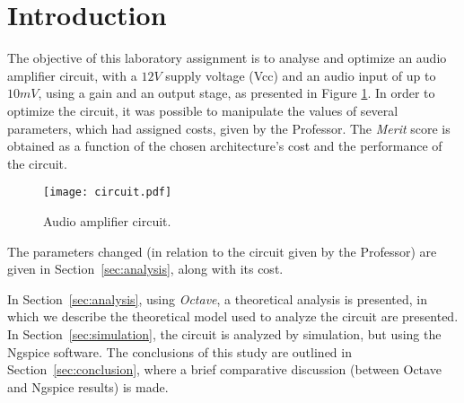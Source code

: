 \section{Introduction}
\label{sec:introduction}

The objective of this laboratory assignment is to analyse and optimize an audio amplifier circuit, with a $12V$ supply voltage (Vcc) and an audio input of up to $10mV$, using a gain and an output stage, as presented in Figure  \ref{fig:circuit}. In order to optimize the circuit, it was possible to manipulate the values of several parameters, which had assigned costs, given by the Professor. The \textit{Merit} score is obtained as a function of the chosen architecture's cost and the performance of the circuit. 


\begin{figure}[h] \centering
\texttt{[image: circuit.pdf]}
\caption{Audio amplifier circuit.}
\label{fig:circuit}
\end{figure}

The parameters changed (in relation to the circuit given by the Professor) are given in Section~\ref{sec:analysis}, along with its cost.


In Section~\ref{sec:analysis}, using \textit{Octave}, a theoretical analysis is presented, in which we describe the theoretical model used to analyze the circuit are presented. In Section~\ref{sec:simulation}, the circuit is analyzed by simulation, but using the Ngspice software. The conclusions of this study are outlined in Section~\ref{sec:conclusion}, where a brief comparative discussion (between Octave and Ngspice results) is made.